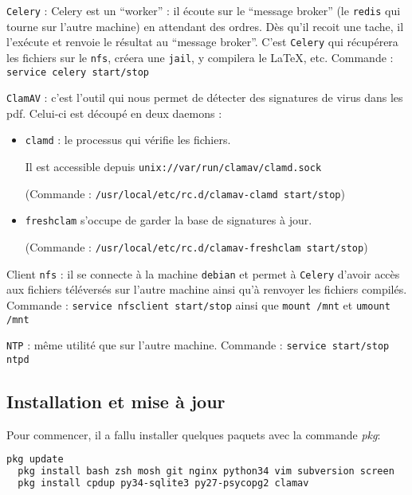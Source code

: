 \documentclass[10pt,a4paper]{article}
\begin{document}
\texttt{Celery} : Celery est un ``worker'' : il écoute sur le ``message broker'' (le \texttt{redis} qui tourne sur l'autre machine) en attendant des ordres.
Dès qu'il recoit une tache, il l'exécute et renvoie le résultat au ``message broker''.
C'est \texttt{Celery} qui récupérera les fichiers sur le \texttt{nfs}, créera une \texttt{jail}, y compilera le \LaTeX, etc.
Commande : \texttt{service celery start/stop}

\texttt{ClamAV} : c'est l'outil qui nous permet de détecter des signatures de virus dans les pdf.
Celui-ci est découpé en deux daemons :
        \begin{itemize}
            \item \texttt{clamd} : le processus qui vérifie les fichiers.

            Il est accessible depuis \texttt{unix://var/run/clamav/clamd.sock}

            (Commande : \texttt{/usr/local/etc/rc.d/clamav-clamd start/stop})
            \item \texttt{freshclam} s'occupe de garder la base de signatures à jour.

            (Commande : \texttt{/usr/local/etc/rc.d/clamav-freshclam start/stop})
        \end{itemize}

\vspace{1em} %
Client \texttt{nfs} : il se connecte à la machine \texttt{debian} et permet à \texttt{Celery} d'avoir accès aux fichiers téléversés sur l'autre machine ainsi qu'à renvoyer les fichiers compilés.
Commande : \texttt{service nfsclient start/stop} ainsi que \texttt{mount /mnt} et \texttt{umount /mnt}

\texttt{NTP} : même utilité que sur l'autre machine.
Commande : \texttt{service start/stop ntpd}

\subsection{Installation et mise à jour}
Pour commencer, il a fallu installer quelques paquets avec la commande \emph{pkg}:
\begin{lstlisting}[language=bash]
  pkg update
  pkg install bash zsh mosh git nginx python34 vim subversion screen
  pkg install cpdup py34-sqlite3 py27-psycopg2 clamav
\end{lstlisting}
\end{document}
